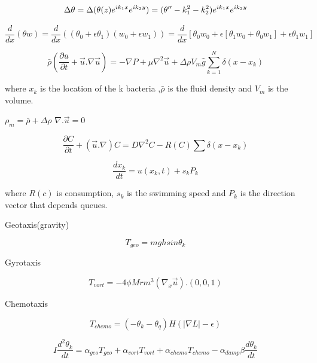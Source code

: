 \documentclass[]{article}
\numberwithin{equation}{section}		%
\begin{document}
\begin{equation}
\Delta \theta = \Delta (\theta(z) e^{ik_1 x} e^{i k_2 y}) = (\theta'' -k_1^2 - k_2^2) e^{ik_1x} e^{ik_2y} \nonumber \\
\end{equation}

\begin{equation}
\frac{d}{dx}(\theta w) = \frac{d}{dx} \left( (\theta_0 + \epsilon \theta_1)(w_0 + \epsilon w_1) \right) = \frac{d}{dx} [\theta_0 w_0 + \epsilon [\theta_1 w_0 + \theta_0 w_1] + \epsilon \theta_1 w_1] \nonumber
\end{equation}

\begin{equation}
\bar{\rho} (\frac{\partial \bar{u}}{\partial t} + \vec{u}.\nabla \vec{u}) = -\nabla P + \mu \nabla ^2 \vec{u} + \Delta \rho V_m \hat{g} \sum_{k=1}^N \delta(x-x_k) \nonumber
\end{equation}

where $x_k$ is the location of the k bacteria ,$\bar{\rho} $ is the fluid density and $V_m$ is the volume.

\begin{center}
$\rho_m = \bar{\rho} + \Delta \rho$
$\nabla . \vec{u} = 0$
\end{center}

\begin{equation}
\frac{\partial C}{\partial t} + (\vec{u}.\nabla)C = D \nabla^2 C -R(C) \sum \delta (x-x_k) \nonumber
\end{equation}

\begin{equation}
\frac{d x_k}{d t} = u(x_k, t) + s_k P_k \nonumber
\end{equation}

where $R(c)$ is consumption, $s_k$ is the swimming speed and $P_k$ is the direction vector that depends queues.

Geotaxis(gravity)

\begin{equation}
 T_{geo} = mgh sin\theta_k            \nonumber
\end{equation}

Gyrotaxis

\begin{equation}
 T_{vort} = -4\phi M rm^3(\nabla_x \vec{u}).(0,0,1)             \nonumber
\end{equation}

Chemotaxis

\begin{equation}
 T_{chemo} = (-\theta_k - \theta_q)H(\left| \nabla L \right| - \epsilon)             \nonumber
\end{equation}

\begin{equation}
I \frac{d^2 \theta_k}{dt} = \alpha_{geo} T_{geo} + \alpha_{vort} T_{vort} + \alpha_{chemo} T_{chemo} - \alpha_{damp} \beta \frac{d\theta_k}{dt} \nonumber
\end{equation}
\end{document}

